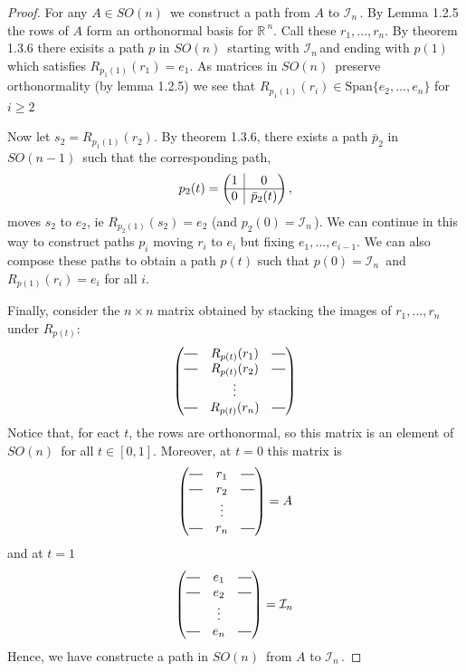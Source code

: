 \documentclass[12pt,a4paper]{article}
\newcommand{\rR}{\ensuremath{\mathbb{R}\,}}
\newcommand{\gsok}[1]{\ensuremath{SO(#1)\,}}
\newcommand{\cin}{\ensuremath{\mathcal{I}_n\,}}
\newcommand*{\horzbar}{\rule[.5ex]{2.5ex}{0.5pt}}
\newcommand{\rvline}{\hspace*{-\arraycolsep}\vline\hspace*{-\arraycolsep}}
\begin{document}
\begin{proof}
For any $A \in \gsok{n}$ we construct a path from $A$ to \cin. By Lemma 1.2.5 the rows of $A$ form an orthonormal basis for $\rR^n$. Call these $r_1, \hdots , r_n$. By theorem 1.3.6 there exisits a path $p$ in \gsok{n} starting with \cin and ending with $p(1)$ which satisfies $R_{p_1(1)}(r_1) = e_1$. As matrices in \gsok{n} preserve orthonormality (by lemma 1.2.5) we see that $R_{p_1(1)}(r_i) \in \mbox{Span}\{e_2, \hdots , e_n\}$ for $i \geq 2$

Now let $s_2 = R_{p_1(1)}(r_2)$. By theorem 1.3.6, there exists a path $\bar{p}_2$ in \gsok{n-1} such that the corresponding path,
\[
p_2(t) =
\begin{pmatrix}
  1 & \rvline & 0
  \\
\hline

  0 & \rvline & \bar{p}_2(t)
\end{pmatrix},
\]
moves $s_2$ to $e_2$, ie $R_{p_2(1)}(s_2) = e_2$ (and $p_2(0) = \cin$). We can continue in this way to construct paths $p_i$ moving $r_i$ to $e_i$ but fixing $e_1, \hdots , e_{i-1}$. We can also compose these paths to obtain a path $p(t)$ such that $p(0) = \cin$ and $R_{p(1)}(r_i) = e_i$ for all $i$.

Finally, consider the $n\times n$ matrix obtained by stacking the images of $r_1, \hdots , r_n$ under $R_{p(t)}$:
\[
\begin{pmatrix}
  \horzbar & R_{p(t)}(r_1) & \horzbar \\
  \horzbar & R_{p(t)}(r_2) & \horzbar \\
  & \vdots &        \\
  \horzbar & R_{p(t)}(r_n) & \horzbar
\end{pmatrix}
\]
Notice that, for eact $t$, the rows are orthonormal, so this matrix is an element of \gsok{n} for all $t \in [0, 1]$. Moreover, at $t=0$ this matrix is
\[
\begin{pmatrix}
  \horzbar & r_1 & \horzbar \\
  \horzbar & r_2 & \horzbar \\
  & \vdots &        \\
  \horzbar & r_n & \horzbar
\end{pmatrix}
= A
\]
and at $t=1$
\[
\begin{pmatrix}
  \horzbar & e_1 & \horzbar \\
  \horzbar & e_2 & \horzbar \\
  & \vdots & \\
  \horzbar & e_n & \horzbar \\
\end{pmatrix}
= \cin
\]
Hence, we have constructe a path in \gsok{n} from $A$ to \cin.
\end{proof}
\end{document}
